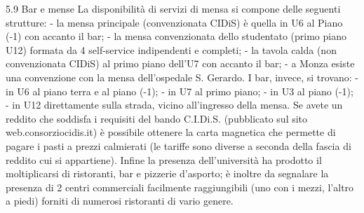 5.9 Bar e mense
La disponibilità di servizi di mensa si compone delle seguenti strutture: 
      - la mensa principale (convenzionata CIDiS) è quella in U6 al Piano (-1) con accanto il bar; 
      - la mensa convenzionata dello studentato (primo piano U12) formata da 4 self-service indipendenti e completi; 
      - la tavola calda (non convenzionata CIDiS) al primo piano dell'U7 con accanto il bar; 
      - a Monza esiste una convenzione con la mensa dell'ospedale S. Gerardo. 
I bar, invece, si trovano: 
      - in U6 al piano terra  e al piano (-1); 
      - in U7 al primo piano; 
      - in U3 al piano (-1); 
      - in U12 direttamente sulla strada, vicino all'ingresso della mensa. 
Se avete un reddito che soddisfa i requisiti del bando C.I.Di.S. (pubblicato sul sito web.consorziocidis.it) è possibile ottenere la carta magnetica che permette di pagare i pasti a prezzi calmierati (le tariffe sono diverse a seconda della fascia di reddito cui si appartiene). 
Infine la presenza dell'università ha prodotto il moltiplicarsi di ristoranti, bar e pizzerie d'asporto; è inoltre da segnalare la presenza di 2 centri commerciali facilmente raggiungibili (uno con i mezzi, l'altro a piedi) forniti di numerosi ristoranti di vario genere. 
